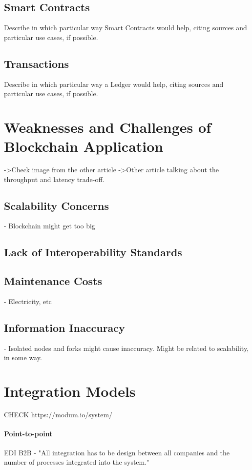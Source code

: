 \subsection{Smart Contracts}
Describe in which particular way Smart Contracts would help, citing sources and particular use cases, if possible. 
        
\subsection{Transactions}
Describe in which particular way a Ledger would help, citing sources and particular use cases, if possible.

\section{Weaknesses and Challenges of Blockchain Application}
->Check image from the other article
->Other article talking about the throughput and latency trade-off.
\subsection{Scalability Concerns}
- Blockchain might get too big
\subsection{Lack of Interoperability Standards}

\subsection{Maintenance Costs}
- Electricity, etc
        
\subsection{Information Inaccuracy}        
- Isolated nodes and forks might cause inaccuracy. Might be related to scalability, in some way.

\section{Integration Models}
CHECK https://modum.io/system/

\paragraph{Point-to-point} EDI B2B - "All
integration has to be design between all companies and
the number of processes integrated into the system."
        
